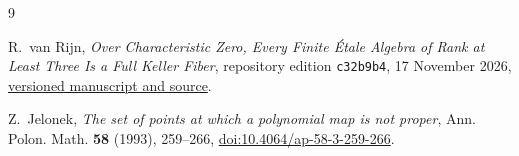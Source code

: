 \documentclass[11pt]{article}
\numberwithin{equation}{section}
\begin{document}
\begin{thebibliography}{9}
\footnotesize

R.~van Rijn, \emph{Over Characteristic Zero, Every Finite \'Etale Algebra
of Rank at Least Three Is a Full Keller Fiber},
repository edition \texttt{c32b9b4}, 17 November 2026,
\href{https://github.com/royvanrijn/jacobian-research/tree/c32b9b4d273cf7988e85184a0d5eae9c488727fd/unpublished/common-arithmetic-fibers}{versioned manuscript and source}.

Z.~Jelonek,
\emph{The set of points at which a polynomial map is not proper},
Ann. Polon. Math. \textbf{58} (1993), 259--266,
\href{https://doi.org/10.4064/ap-58-3-259-266}
{doi:10.4064/ap-58-3-259-266}.

\end{thebibliography}
\end{document}

